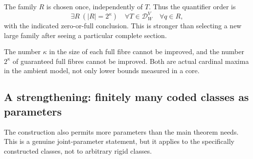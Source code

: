 \documentclass[11pt,letterpaper]{article}
\theoremstyle{definition}
\numberwithin{equation}{section}
\newcommand{\Dg}{\mathcal D_W^V}
\begin{document}
The family $R$ is chosen once, independently of $T$. Thus the quantifier order is
\[
\exists R\ (|R|=2^\kappa)\quad
\forall T\in\Dg\quad\forall q\in R,
\]
with the indicated zero-or-full conclusion. This is stronger than selecting a new large family after seeing a particular complete section.

The number $\kappa$ in the size of each full fibre cannot be improved, and the number $2^\kappa$ of guaranteed full fibres cannot be improved. Both are actual cardinal maxima in the ambient model, not only lower bounds measured in a core.

\subsection{A strengthening: finitely many coded classes as parameters}

The construction also permits more parameters than the main theorem needs. This is a genuine joint-parameter statement, but it applies to the specifically constructed classes, not to arbitrary rigid classes.
\end{document}
